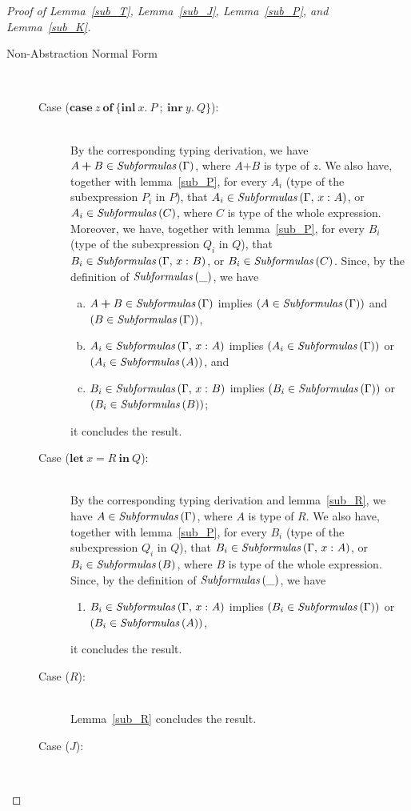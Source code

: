 \documentclass[a4paper]{article}
\newcommand{\typecolor}{}
\newcommand{\termcolor}{}
\newcommand{\tp}[1]{{\typecolor #1}}
\newcommand{\tm}[1]{{\termcolor #1}}
\newcommand{\typsum}[2]{#1\boldsymbol{+}#2}
\newcommand{\expshr}[3]{\mathbf{let}\ #1\boldsymbol{=}#2\ \mathbf{in}\ #3}
\newcommand{\expcas}[5]{\mathbf{case}\ #1\ \mathbf{of}\ \boldsymbol{\{}\mathbf{inl}\ #2.\ #3\ \boldsymbol{;}\ \mathbf{inr}\ #4.\ #5\boldsymbol{\}}}
\newcommand{\typing}[2]{\tm{#1:\ }\tp{#2}}
\newcommand{\typenvcon}[2]{\tp{\Gamma,}\ \typing{#1}{#2}}
\newcommand{\txt}[1]{\text{\textit{#1}}}
\newcommand{\subformulas}[1]{\txt{Subformulas}\,(#1)}
\begin{document}
\begin{proof}[Proof of Lemma~\ref{sub_T}, Lemma~\ref{sub_J}, Lemma~\ref{sub_P}, and Lemma~\ref{sub_K}]
\begin{description}
\item[Non-Abstraction Normal Form]\ \\
\begin{description}
\item[Case ($\expcas{z}{x}{P}{y}{Q}$):]\ \\
  By the corresponding typing derivation, we have $\typsum{A}{B} \in
  \subformulas{\Gamma}$, where $\typsum{A}{B}$ is type of $z$. We also
  have, together with lemma~\ref{sub_P}, for every $A_i$ (type of the
  subexpression $P_i$ in $P$), that $A_i \in
  \subformulas{\typenvcon{x}{A}}$, or $A_i \in \subformulas{C}$, where
  $C$ is type of the whole expression. Moreover, we have, together
  with lemma~\ref{sub_P}, for every $B_i$ (type of the subexpression
  $Q_i$ in $Q$), that $B_i \in \subformulas{\typenvcon{x}{B}}$, or
  $B_i \in \subformulas{C}$.  Since, by the definition of
  $\subformulas{\_}$, we have
  \begin{enumerate}[(a)] 
     \item $\typsum{A}{B} \in \subformulas{\Gamma}$ implies $(A \in \subformulas{\Gamma})$ and $(B \in \subformulas{\Gamma})$,
     \item $A_i \in \subformulas{\typenvcon{x}{A}}$ implies $(A_i \in \subformulas{\Gamma})$ or $(A_i \in \subformulas{A})$, and
     \item $B_i \in \subformulas{\typenvcon{x}{B}}$ implies $(B_i \in \subformulas{\Gamma})$ or $(B_i \in \subformulas{B})$; 
  \end{enumerate}
  it concludes the result. 
\item[Case ($\expshr{x}{R}{Q}$):]\ \\
  By the corresponding typing derivation and lemma~\ref{sub_R}, we
  have $A \in \subformulas{\Gamma}$, where $A$ is type of $R$. We also
  have, together with lemma~\ref{sub_P}, for every $B_i$ (type of the subexpression $Q_i$ in
  $Q$), that $B_i \in \subformulas{\typenvcon{x}{A}}$, or $B_i \in
  \subformulas{B}$, where $B$ is type of the whole expression. Since, by the definition of $\subformulas{\_}$, we have
  \begin{enumerate}[] 
     \item $B_i \in \subformulas{\typenvcon{x}{A}}$ implies $(B_i \in \subformulas{\Gamma})$ or $(B_i \in \subformulas{A})$,
  \end{enumerate}
  it concludes the result.
\item[Case ($R$):]\ \\
  Lemma~\ref{sub_R} concludes the result.
\item[Case ($J$):]\ \\

\end{description}
\end{description}
\end{proof}
\end{document}
